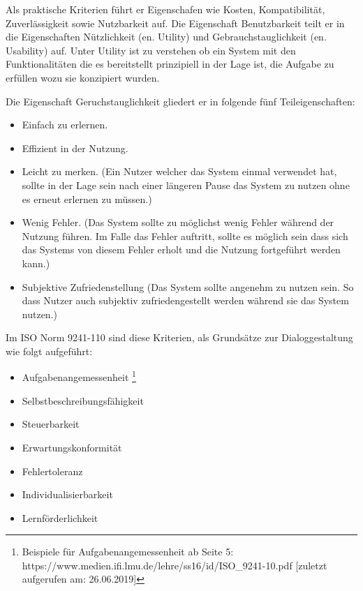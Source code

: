 Als praktische Kriterien führt er Eigenschafen wie Kosten, Kompatibilität, Zuverlässigkeit sowie Nutzbarkeit auf. Die Eigenschaft Benutzbarkeit teilt er in die Eigenschaften Nützlichkeit (en. Utility) und Gebrauchstauglichkeit (en. Usability) auf. Unter Utility ist zu verstehen ob ein System mit den Funktionalitäten die es bereitstellt prinzipiell in der Lage ist, die Aufgabe zu erfüllen wozu sie konzipiert wurden.

Die Eigenschaft Geruchstauglichkeit gliedert er in folgende fünf Teileigenschaften: 

\begin{itemize}
	\item Einfach zu erlernen.
	\item Effizient in der Nutzung.
	\item Leicht zu merken. (Ein Nutzer welcher das System einmal verwendet hat, sollte in der Lage sein nach einer längeren Pause das System zu nutzen ohne es erneut erlernen zu müssen.)
	\item Wenig Fehler. (Das System sollte zu möglichst wenig Fehler während der Nutzung führen. Im Falle das Fehler auftritt, sollte es möglich sein dass sich das Systems von diesem Fehler erholt und die Nutzung fortgeführt werden kann.)
	\item Subjektive Zufriedenstellung (Das System sollte angenehm zu nutzen sein. So dass Nutzer auch subjektiv zufriedengestellt werden während sie das System nutzen.)
\end{itemize}

Im ISO Norm  9241-110 sind diese Kriterien, als Grundsätze zur Dialoggestaltung wie folgt aufgeführt:

\begin{itemize}
	\item Aufgabenangemessenheit \footnote[4]{Beispiele für Aufgabenangemessenheit ab Seite 5: https://www.medien.ifi.lmu.de/lehre/ss16/id/ISO\_9241-10.pdf [zuletzt aufgerufen am: 26.06.2019]}
	\item Selbstbeschreibungsfähigkeit
	\item Steuerbarkeit
	\item Erwartungskonformität
	\item Fehlertoleranz
	\item Individualisierbarkeit
	\item Lernförderlichkeit
\end{itemize}


